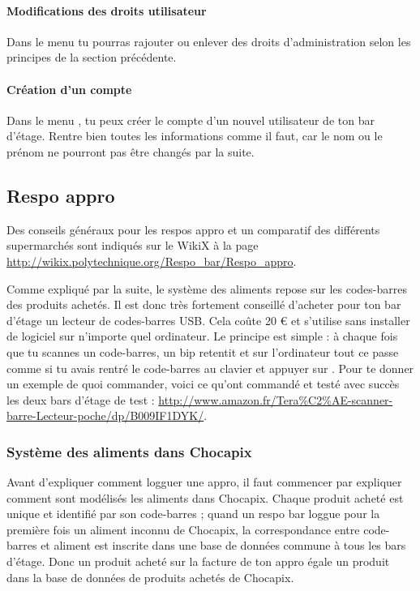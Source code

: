 \documentclass[12pt,french]{article}
\begin{document}
\paragraph{Modifications des droits utilisateur} Dans le menu  tu pourras rajouter ou enlever des droits d'administration selon les principes de la section précédente.

\paragraph{Création d'un compte} Dans le menu , tu peux créer le compte d'un nouvel utilisateur de ton bar d'étage. Rentre bien toutes les informations comme il faut, car le nom ou le prénom ne pourront pas être changés par la suite.

\subsection{Respo appro}

Des conseils généraux pour les respos appro et un comparatif des différents supermarchés sont indiqués sur le WikiX à la page \url{http://wikix.polytechnique.org/Respo_bar/Respo_appro}.

Comme expliqué par la suite, le système des aliments repose sur les codes-barres des produits achetés. Il est donc très fortement conseillé d'acheter pour ton bar d'étage un lecteur de codes-barres USB. Cela coûte 20 € et s'utilise sans installer de logiciel sur n'importe quel ordinateur. Le principe est simple : à chaque fois que tu scannes un code-barres, un bip retentit et sur l'ordinateur tout ce passe comme si tu avais rentré le code-barres au clavier et appuyer sur . Pour te donner un exemple de quoi commander, voici ce qu'ont commandé et testé avec succès les deux bars d'étage de test : \url{http://www.amazon.fr/Tera%C2%AE-scanner-barre-Lecteur-poche/dp/B009IF1DYK/}.

\subsubsection{Système des aliments dans Chocapix}

Avant d'expliquer comment logguer une appro, il faut commencer par expliquer comment sont modélisés les aliments dans Chocapix. Chaque produit acheté est unique et identifié par son code-barres ; quand un respo bar loggue pour la première fois un aliment inconnu de Chocapix, la correspondance entre code-barres et aliment est inscrite dans une base de données commune à tous les bars d'étage. Donc un produit acheté sur la facture de ton appro égale un produit dans la base de données de produits achetés de Chocapix.
\end{document}
